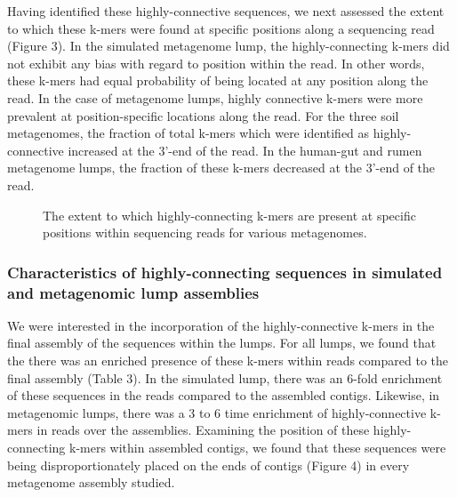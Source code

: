 \documentclass[11pt]{article} %
\begin{document}
Having identified these highly-connective sequences, we next assessed the extent to which these k-mers were found at specific positions along a sequencing read (Figure 3).  In the simulated metagenome lump, the highly-connecting k-mers did not exhibit any bias with regard to position within the read.  In other words, these k-mers had equal probability of being located at any position along the read.  In the case of metagenome lumps, highly connective k-mers were more prevalent at position-specific locations along the read.   For the three soil metagenomes, the fraction of total k-mers which were identified as highly-connective increased at the 3'-end of the read.  In the human-gut and rumen metagenome lumps, the fraction of these k-mers decreased at the 3'-end of the read.    

\begin{figure}
\caption{The extent to which highly-connecting k-mers are present at specific positions within sequencing reads for various metagenomes.}
\end{figure}


\subsubsection{Characteristics of highly-connecting sequences in simulated and metagenomic lump assemblies}

We were interested in the incorporation of the highly-connective k-mers in the final assembly of the sequences within the lumps.  For all lumps, we found that the there was an enriched presence of these k-mers within reads compared to the final assembly (Table 3).  In the simulated lump, there was an 6-fold enrichment of these sequences in the reads compared to the assembled contigs.  Likewise, in metagenomic lumps, there was a 3 to 6 time enrichment of highly-connective k-mers in reads over the assemblies.  Examining the position of these highly-connecting k-mers within assembled contigs, we found that these sequences were being disproportionately placed on the ends of contigs (Figure 4) in every metagenome assembly studied.  
\end{document}
